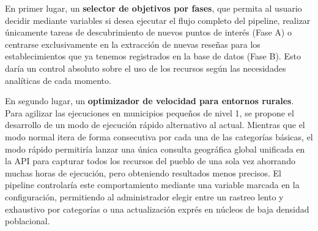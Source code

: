 En primer lugar, un \textbf{selector de objetivos por fases}, que permita al usuario decidir mediante variables si desea ejecutar el flujo completo del pipeline, realizar únicamente tareas de descubrimiento de nuevos puntos de interés (Fase A) o centrarse exclusivamente en la extracción de nuevas reseñas para los establecimientos que ya tenemos registrados en la base de datos (Fase B). Esto daría un control absoluto sobre el uso de los recursos según las necesidades analíticas de cada momento.

En segundo lugar, un \textbf{optimizador de velocidad para entornos rurales}. Para agilizar las ejecuciones en municipios pequeños de nivel 1, se propone el desarrollo de un modo de ejecución rápido alternativo al actual. Mientras que el modo normal itera de forma consecutiva por cada una de las categorías básicas, el modo rápido permitiría lanzar una única consulta geográfica global unificada en la API para capturar todos los recursos del pueblo de una sola vez ahorrando muchas horas de ejecución, pero obteniendo resultados menos precisos. El pipeline controlaría este comportamiento mediante una variable marcada en la configuración, permitiendo al administrador elegir entre un rastreo lento y exhaustivo por categorías o una actualización exprés en núcleos de baja densidad poblacional.

